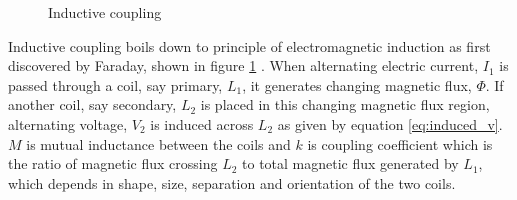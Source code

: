 \documentclass[12pt,a4paper,UKenglish]{report}
\begin{document}
\begin{figure} [!htbp]
  \centering 
\hfill
 \caption{Inductive coupling } 
\label{fig:ant_induction} 
\end{figure}

Inductive coupling boils down to principle of electromagnetic induction as first discovered by Faraday, shown in figure \ref{fig:ant_induction} . When alternating electric current, $I_{1}$ is passed through 
a coil, say primary, $L_{1}$, it generates changing magnetic flux, $\Phi$. If another coil, say secondary, $L_{2}$ is placed in this changing 
magnetic flux region, alternating voltage, $V_{2}$ is induced across $L_{2}$ as given by equation  \ref{eq:induced_v}. $M$ is mutual inductance between the coils and $k$ is coupling coefficient which is the ratio of magnetic flux crossing $L_{2}$ to total magnetic flux generated by $L_{1}$, which depends in shape, size, separation and orientation of the two coils.
\end{document}
